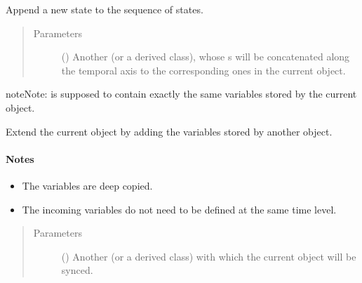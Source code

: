 \documentclass[letterpaper,10pt,english]{sphinxmanual}
\begin{document}
\begin{fulllineitems}
\begin{fulllineitems}
\label{\detokenize{api:storages.grid_data.GridData.append}}
Append a new state to the sequence of states.
\begin{quote}\begin{description}
\item[{Parameters}] \leavevmode
{} () \textendash{} Another {\hyperref[\detokenize{api:storages.grid_data.GridData}]{}} (or a derived class), whose s
will be concatenated along the temporal axis to the corresponding ones in the current object.

\end{description}\end{quote}

\begin{sphinxadmonition}{note}{Note:}
 is supposed to contain exactly the same variables stored by the current object.
\end{sphinxadmonition}

\end{fulllineitems}


\begin{fulllineitems}
\label{\detokenize{api:storages.grid_data.GridData.extend}}
Extend the current object by adding the variables stored by another object.
\paragraph{Notes}
\begin{itemize}
\item {} 
The variables are deep copied.

\item {} 
The incoming variables do not need to be defined at the same time level.

\end{itemize}
\begin{quote}\begin{description}
\item[{Parameters}] \leavevmode
{} () \textendash{} Another {\hyperref[\detokenize{api:storages.grid_data.GridData}]{}} (or a derived class) with which the current object will be synced.


\end{description}
\end{quote}
\end{fulllineitems}
\end{fulllineitems}
\end{document}
